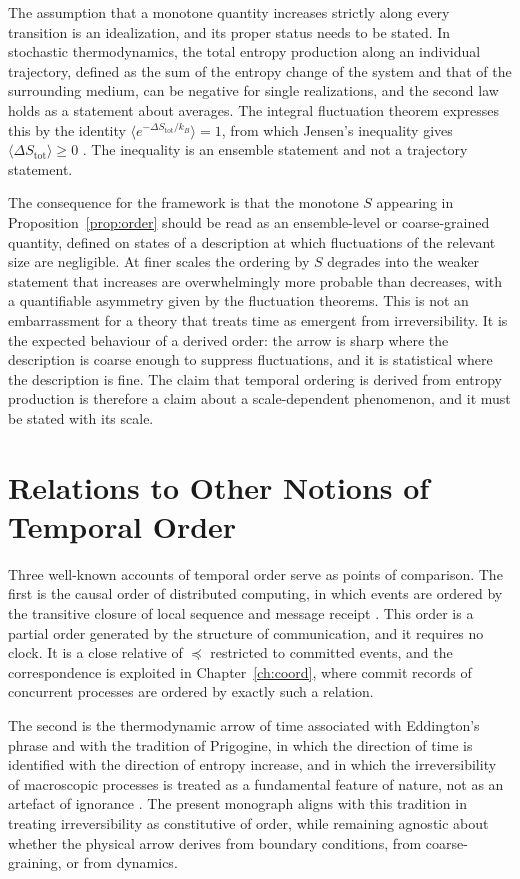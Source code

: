 \documentclass[11pt,twoside,openright]{book}
\theoremstyle{plain}
\theoremstyle{definition}
\theoremstyle{remark}
\begin{document}
The assumption that a monotone quantity increases strictly along every transition is an idealization, and its proper status needs to be stated. In stochastic thermodynamics, the total entropy production along an individual trajectory, defined as the sum of the entropy change of the system and that of the surrounding medium, can be negative for single realizations, and the second law holds as a statement about averages. The integral fluctuation theorem expresses this by the identity $\langle e^{-\Delta S_{\mathrm{tot}}/k_B}\rangle=1$, from which Jensen's inequality gives $\langle\Delta S_{\mathrm{tot}}\rangle\ge0$ \cite{crooks1999,seifert2012}. The inequality is an ensemble statement and not a trajectory statement.

The consequence for the framework is that the monotone $S$ appearing in Proposition~\ref{prop:order} should be read as an ensemble-level or coarse-grained quantity, defined on states of a description at which fluctuations of the relevant size are negligible. At finer scales the ordering by $S$ degrades into the weaker statement that increases are overwhelmingly more probable than decreases, with a quantifiable asymmetry given by the fluctuation theorems. This is not an embarrassment for a theory that treats time as emergent from irreversibility. It is the expected behaviour of a derived order: the arrow is sharp where the description is coarse enough to suppress fluctuations, and it is statistical where the description is fine. The claim that temporal ordering is derived from entropy production is therefore a claim about a scale-dependent phenomenon, and it must be stated with its scale.

\section{Relations to Other Notions of Temporal Order}

Three well-known accounts of temporal order serve as points of comparison. The first is the causal order of distributed computing, in which events are ordered by the transitive closure of local sequence and message receipt \cite{lamport1978}. This order is a partial order generated by the structure of communication, and it requires no clock. It is a close relative of $\preceq$ restricted to committed events, and the correspondence is exploited in Chapter~\ref{ch:coord}, where commit records of concurrent processes are ordered by exactly such a relation.

The second is the thermodynamic arrow of time associated with Eddington's phrase and with the tradition of Prigogine, in which the direction of time is identified with the direction of entropy increase, and in which the irreversibility of macroscopic processes is treated as a fundamental feature of nature, not as an artefact of ignorance \cite{eddington1928,prigogine1980}. The present monograph aligns with this tradition in treating irreversibility as constitutive of order, while remaining agnostic about whether the physical arrow derives from boundary conditions, from coarse-graining, or from dynamics.
\end{document}
